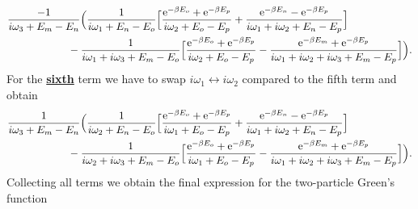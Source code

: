 \documentclass[12pt,a4paper]{scrartcl}
\numberwithin{equation}{section}
\renewcommand{\exp}[1]{\mathrm{e}^{#1}}
\begin{document}
\begin{align}
    &
 \frac{-1}{i\omega_3 +E_m-E_n}
 \Big( \frac{1}{i\omega_1 +E_n-E_o}
 \Big[
 \frac{\exp{-\beta E_o}+\exp{-\beta E_p} }{i\omega_2 +E_o-E_p} 
  + \frac{ \exp{-\beta E_n} - \exp{-\beta E_p} }{ i\omega_1 + i\omega_2 + E_n- E_p } 
 \Big] \nonumber \\
 & \hspace*{2cm} -  \frac{1}{i\omega_1+ i\omega_3 + E_m-E_o}
 \Big[
  \frac{\exp{-\beta E_o}+\exp{-\beta E_p} }{i\omega_2 +E_o-E_p} 
 -  \frac{ \exp{-\beta E_m}+\exp{-\beta E_p} }{ i\omega_1 + i\omega_2 + i\omega_3 + E_m- E_p } 
 \Big]
 \Big) .
\end{align}
For the \textbf{\underline{sixth}} term we have to swap $i\omega_1 \leftrightarrow i\omega_2$ compared to the fifth term and obtain
\begin{align}
    &
 \frac{1}{i\omega_3 +E_m-E_n}
 \Big( \frac{1}{i\omega_2 +E_n-E_o}
 \Big[
 \frac{\exp{-\beta E_o}+\exp{-\beta E_p} }{i\omega_1 +E_o-E_p} 
  + \frac{ \exp{-\beta E_n} - \exp{-\beta E_p} }{ i\omega_1 + i\omega_2 + E_n- E_p } 
 \Big] \nonumber \\
 & \hspace*{2cm} -  \frac{1}{i\omega_2+ i\omega_3 + E_m-E_o}
 \Big[
  \frac{\exp{-\beta E_o}+\exp{-\beta E_p} }{i\omega_1 +E_o-E_p} 
 -  \frac{ \exp{-\beta E_m}+\exp{-\beta E_p} }{ i\omega_1 + i\omega_2 + i\omega_3 + E_m- E_p } 
 \Big]
 \Big) .
\end{align}
Collecting all terms we obtain the final expression for the two-particle Green's function
\end{document}
